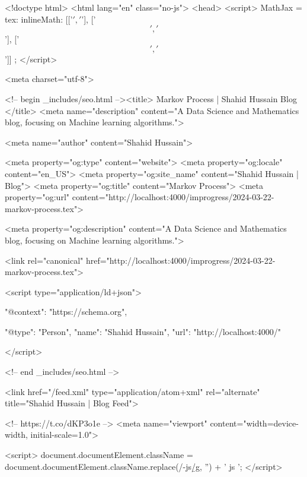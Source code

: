 <!doctype html>
<html lang="en" class="no-js">
  <head>
    <script>
      MathJax = {
        tex: {
          inlineMath: [['$', '$'], ['\[','\]'], ['$$', '$$']]
        }
      };
    </script>

    <meta charset="utf-8">

<!-- begin _includes/seo.html --><title>            Markov Process | Shahid Hussain      Blog      </title>
<meta name="description" content="A Data Science and Mathematics blog, focusing on Machine learning algorithms.">


  <meta name="author" content="Shahid Hussain">
  


<meta property="og:type" content="website">
<meta property="og:locale" content="en_US">
<meta property="og:site_name" content="Shahid Hussain | Blog">
<meta property="og:title" content="Markov Process">
<meta property="og:url" content="http://localhost:4000/improgress/2024-03-22-markov-process.tex">


  <meta property="og:description" content="A Data Science and Mathematics blog, focusing on Machine learning algorithms.">












<link rel="canonical" href="http://localhost:4000/improgress/2024-03-22-markov-process.tex">




<script type="application/ld+json">
  {
    "@context": "https://schema.org",
    
      "@type": "Person",
      "name": "Shahid Hussain",
      "url": "http://localhost:4000/"
    
  }
</script>







<!-- end _includes/seo.html -->



  <link href="/feed.xml" type="application/atom+xml" rel="alternate" title="Shahid Hussain | Blog Feed">


<!-- https://t.co/dKP3o1e -->
<meta name="viewport" content="width=device-width, initial-scale=1.0">

<script>
  document.documentElement.className = document.documentElement.className.replace(/\bno-js\b/g, '') + ' js ';
</script>

